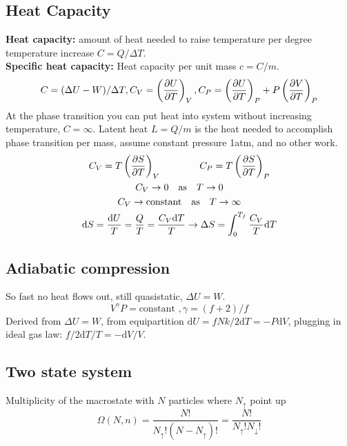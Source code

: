 \documentclass[a4paper, norsk, 8pt]{article}
\begin{document}
\begin{multicols*}{3}
\subsection*{\footnotesize  Heat Capacity}
\textbf{Heat capacity:} amount of heat needed to raise temperature per degree temperature increase $C=Q/\Delta T$.\\
\textbf{Specific heat capacity:} Heat capacity per unit mass $c=C/m$.\\
\begin{equation*}
  C = (\Delta U - W)/\Delta T, C_V = \left(\pdv{U}{T}\right)_V, C_P = \left(\pdv{U}{T}\right)_P + P\left( \pdv{V}{T} \right)_P
\end{equation*}
At the phase transition you can put heat into system without increasing temperature, $C=\infty$. Latent heat $L=Q/m$ is the heat needed to accomplish phase transition per mass, assume constant pressure 1atm, and no other work.
\begin{gather*}
  C_V = T\left( \pdv{S}{T} \right)_V \qquad \qquad   C_P = T \left( \pdv{S}{T} \right)_P\\
  C_V \rightarrow 0 \quad \text{as} \quad T \rightarrow 0 \\
  C_V \rightarrow \text{constant} \quad \text{as} \quad T \rightarrow \infty \\
  \mbox{d}S = \frac{\mbox{d}U}{T} = \frac{Q}{T} = \frac{C_V\mbox{d}T}{T} \rightarrow \Delta S = \int_0^{T_f}\frac{C_V}{T}\mbox{d}T
\end{gather*}


\subsection*{\footnotesize  Adiabatic compression}
So fast no heat flows out, still quasistatic, $\Delta U = W$.
$$V^{\gamma}P = \text{constant }, \gamma = (f+2)/f$$
Derived from $\Delta U = W$, from equipartition $\mbox{d}U=fNk/2 \mbox{d}T = -P\mbox{d}V$, plugging in ideal gas law: $f/2 \mbox{d}T/T = -\mbox{d}V/V$.
\subsection*{\footnotesize  Two state system}
Multiplicity of the macrostate with $N$ particles where $N_{\uparrow}$ point up
\begin{equation*}
  \Omega(N, n) = \frac{N!}{N_{\uparrow}! (N-N_{\uparrow})!} =  \frac{N!}{N_{\uparrow}! N_{\downarrow}!}
\end{equation*}

\end{multicols*}
\end{document}
